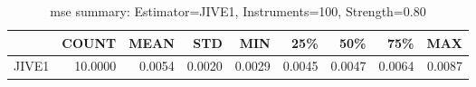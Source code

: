 \begin{table}[ht]
\centering
\caption{mse summary: Estimator=JIVE1, Instruments=100, Strength=0.80}
\begin{tabular}{lrrrrrrrr}
\toprule
 & COUNT & MEAN & STD & MIN & 25\% & 50\% & 75\% & MAX \\
\midrule
JIVE1 & 10.0000 & 0.0054 & 0.0020 & 0.0029 & 0.0045 & 0.0047 & 0.0064 & 0.0087 \\
\bottomrule
\end{tabular}
\end{table}
